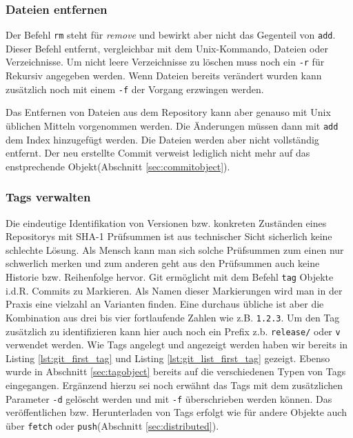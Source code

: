 

\subsubsection{Dateien entfernen}
Der Befehl \texttt{rm} steht für \textit{remove} und bewirkt aber nicht das
Gegenteil von \texttt{add}. Dieser Befehl entfernt, vergleichbar mit dem
Unix-Kommando, Dateien oder Verzeichnisse. Um nicht leere Verzeichnisse zu
löschen muss noch ein \texttt{-r} für Rekursiv angegeben werden. Wenn Dateien
bereits verändert wurden kann zusätzlich noch mit einem \texttt{-f} der Vorgang
erzwingen werden.



Das Entfernen von Dateien aus dem Repository kann aber genauso mit Unix
üblichen Mitteln vorgenommen werden. Die Änderungen müssen dann mit
\texttt{add} dem Index hinzugefügt werden. Die Dateien werden aber nicht
vollständig entfernt. Der neu erstellte Commit verweist lediglich nicht mehr
auf das enstprechende Objekt(Abschnitt
\ref{sec:commitobject}).\cite[S.~43-44]{gitosp}

\subsubsection{Tags verwalten}\label{sec:managetags}
Die eindeutige Identifikation von Versionen bzw. konkreten Zuständen eines
Repositorys mit \gls{SHA-1} Prüfsummen ist aus technischer Sicht sicherlich
keine schlechte Lösung. Als Mensch kann man sich solche Prüfsummen zum einen
nur schwerlich merken und zum anderen geht aus den Prüfsummen auch keine
Historie bzw. Reihenfolge hervor. Git ermöglicht mit dem Befehl \texttt{tag}
Objekte i.d.R.  Commits zu Markieren. Als Namen dieser Markierungen wird man in
der Praxis eine vielzahl an Varianten finden. Eine durchaus übliche ist aber
die Kombination aus drei bis vier fortlaufende Zahlen wie z.B. \texttt{1.2.3}.
Um den Tag zusätzlich zu identifizieren kann hier auch noch ein Prefix z.b.
\texttt{release/} oder \texttt{v} verwendet werden. Wie Tags angelegt und
angezeigt werden haben wir bereits in Listing \ref{lst:git_first_tag} und
Listing \ref{lst:git_list_first_tag} gezeigt. Ebenso wurde in Abschnitt
\ref{sec:tagobject} bereits auf die verschiedenen Typen von Tags eingegangen.
Ergänzend hierzu sei noch erwähnt das Tags mit dem zusätzlichen Parameter
\texttt{-d} gelöscht werden und mit \texttt{-f} überschrieben werden können.
Das veröffentlichen bzw. Herunterladen von Tags erfolgt wie für andere Objekte
auch über \texttt{fetch} oder \texttt{push}(Abschnitt \ref{sec:distributed}).

